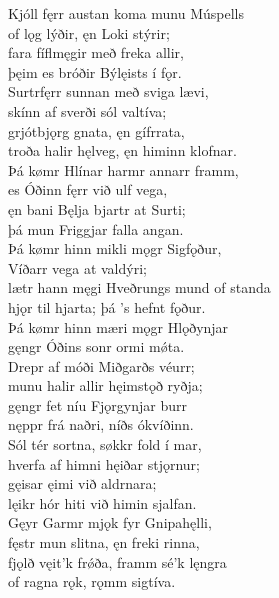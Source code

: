 \bva Kjóll fęrr austan \hld koma munu Múspells \\%
of lǫg lýðir, \hld ęn Loki stýrir; \\%
fara fíflmęgir \hld með freka allir, \\%
þęim es bróðir \hld Býlęists í fǫr.\\%

\bva Surtr\footnotemark[19] fęrr sunnan \hld með sviga lævi, \\%
skínn af sverði \hld sól valtíva; \\%
grjótbjǫrg gnata, \hld ęn gífr\footnotemark[20] rata, \\%
troða halir hęlveg, \hld ęn himinn klofnar.
\\%

\bva Þá kømr Hlínar \hld harmr annarr framm, \\%
es Óðinn fęrr \hld við ulf vega, \\%
ęn bani Bęlja \hld bjartr at Surti; \\%
þá mun Friggjar \hld falla angan.\\%

\bva Þá kømr hinn mikli \hld mǫgr Sigfǫður, \\%
Víðarr vega \hld at valdýri; \\%
lætr hann męgi Hveðrungs \hld mund of standa \\%
hjǫr til hjarta; \hld þá ’s hefnt fǫður.\\%

\bva Þá kømr hinn mæri \hld mǫgr Hlǫðynjar \\%
gęngr Óðins sonr \hld ormi mǿta. \\%
Drepr af móði \hld Miðgarðs véurr; \\%
munu halir allir \hld hęimstǫð ryðja; \\%
gęngr fet níu \hld Fjǫrgynjar burr \\%
nęppr frá naðri, \hld níðs ókvíðinn.\\%

\bva Sól tér sortna, \hld søkkr fold í mar, \\%
hverfa af himni \hld hęiðar stjǫrnur; \\%
gęisar ęimi \hld við aldrnara; \\%
lęikr hór hiti \hld við himin sjalfan.\\%

\bva Gęyr Garmr mjǫk \hld fyr Gnipahęlli, \\%
fęstr mun slitna, \hld ęn freki rinna, \\%
fjǫlð vęit'k frǿða, \hld framm sé'k lęngra \\%
of ragna rǫk, \hld rǫmm sigtíva.\\%

